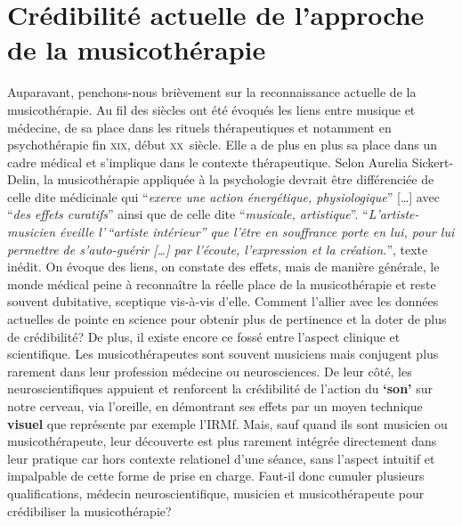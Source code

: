 \section{Crédibilité actuelle de l'approche de la musicothérapie }

Auparavant, penchons-nous brièvement sur la reconnaissance actuelle de la musicothérapie.
Au fil des siècles ont été évoqués les liens entre musique et médecine, de sa place dans les
rituels thérapeutiques et notamment en psychothérapie fin \textsc{xix}\ieme,
début \textsc{xx}\ieme\ siècle.
Elle a de plus en plus sa place dans un cadre médical et s'implique dans le contexte thérapeutique.
Selon Aurelia Sickert-Delin, la musicothérapie appliquée à la
psychologie devrait être différenciée de celle dite médicinale qui
\enquote{\emph{exerce une action
énergétique, physiologique}} [\dots] avec \enquote{\emph{des effets curatifs}}
ainsi que de celle dite \enquote{\emph{musicale, artistique}}.
\enquote{\emph{L'artiste-musicien éveille l'\,``artiste intérieur'' que l'être
en souffrance porte en lui, pour lui permettre de s'auto-guérir [\dots] par
l'écoute, l'expression et la création.}}\autocite[14] {viret:b},
texte inédit.
On évoque des liens, on constate des effets, mais de manière générale, le monde médical peine à reconnaître la réelle place de la musicothérapie et reste souvent dubitative, sceptique vis-à-vis d'elle.
 Comment l'allier avec les données actuelles de pointe en
science pour obtenir plus de pertinence
et la doter de plus de crédibilité?
De plus, il existe encore ce fossé entre l'aspect clinique et scientifique.
Les musicothérapeutes sont souvent musiciens mais conjugent plus
rarement dans leur profession
médecine ou neurosciences. De leur côté, les neuroscientifiques appuient
et renforcent la crédibilité de l'action du \textbf{`son'} sur notre cerveau, via
l'oreille, en démontrant ses effets par un moyen technique
\textbf{visuel} que représente par exemple l'IRMf. Mais, sauf quand ils sont musicien ou
musicothérapeute, leur découverte est plus rarement intégrée
directement dans leur pratique car hors contexte relationel d'une
séance, sans l'aspect intuitif et impalpable de cette forme de prise
en charge.
Faut-il donc cumuler plusieurs qualifications, médecin neuroscientifique,  musicien et musicothérapeute pour crédibiliser la musicothérapie?

